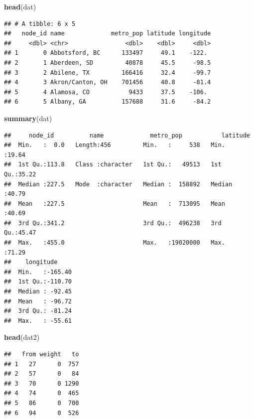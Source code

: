 \documentclass[]{article}
\newenvironment{Shaded}{\begin{snugshade}}{\end{snugshade}}
\newcommand{\KeywordTok}[1]{\textcolor[rgb]{0.13,0.29,0.53}{\textbf{#1}}}
\newcommand{\NormalTok}[1]{#1}
\begin{document}
\begin{Shaded}
\begin{Highlighting}[]
\KeywordTok{head}\NormalTok{(dat)}
\end{Highlighting}
\end{Shaded}

\begin{verbatim}
## # A tibble: 6 x 5
##   node_id name             metro_pop latitude longitude
##     <dbl> <chr>                <dbl>    <dbl>     <dbl>
## 1       0 Abbotsford, BC      133497     49.1    -122. 
## 2       1 Aberdeen, SD         40878     45.5     -98.5
## 3       2 Abilene, TX         166416     32.4     -99.7
## 4       3 Akron/Canton, OH    701456     40.8     -81.4
## 5       4 Alamosa, CO           9433     37.5    -106. 
## 6       5 Albany, GA          157688     31.6     -84.2
\end{verbatim}

\begin{Shaded}
\begin{Highlighting}[]
\KeywordTok{summary}\NormalTok{(dat)}
\end{Highlighting}
\end{Shaded}

\begin{verbatim}
##     node_id          name             metro_pop           latitude    
##  Min.   :  0.0   Length:456         Min.   :     538   Min.   :19.64  
##  1st Qu.:113.8   Class :character   1st Qu.:   49513   1st Qu.:35.22  
##  Median :227.5   Mode  :character   Median :  158892   Median :40.79  
##  Mean   :227.5                      Mean   :  713095   Mean   :40.69  
##  3rd Qu.:341.2                      3rd Qu.:  496238   3rd Qu.:45.47  
##  Max.   :455.0                      Max.   :19020000   Max.   :71.29  
##    longitude      
##  Min.   :-165.40  
##  1st Qu.:-110.70  
##  Median : -92.45  
##  Mean   : -96.72  
##  3rd Qu.: -81.24  
##  Max.   : -55.61
\end{verbatim}

\begin{Shaded}
\begin{Highlighting}[]
\KeywordTok{head}\NormalTok{(dat2)}
\end{Highlighting}
\end{Shaded}

\begin{verbatim}
##   from weight   to
## 1   27      0  757
## 2   57      0   84
## 3   70      0 1290
## 4   74      0  465
## 5   86      0  700
## 6   94      0  526
\end{verbatim}
\end{document}

